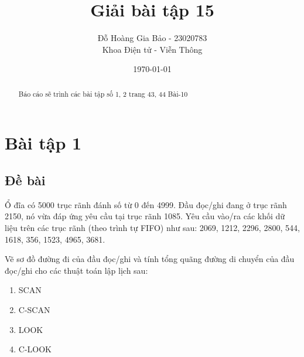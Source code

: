 \documentclass[12pt, letterpaper]{article}
\title{Giải bài tập 15}
\author{Đỗ Hoàng Gia Bảo - 23020783 \\ \small Khoa Điện tử - Viễn Thông}
\date{\today}
\begin{document}
\maketitle

\begin{abstract}
\begin{center}
    Báo cáo sẽ trình các bài tập số 1, 2 trang 43, 44  Bài-10
\end{center}
\end{abstract}
\newpage
\tableofcontents

\newpage
{}
\setcounter{page}{3} %

\section{Bài tập 1}
\subsection{Đề bài}
Ổ đĩa có 5000 trục rãnh đánh số từ 0 đến 4999. Đầu đọc/ghi 
đang ở trục rãnh 2150, nó vừa đáp ứng yêu cầu tại
trục rãnh 1085. Yêu cầu vào/ra các khối dữ liệu trên các
trục rãnh (theo trình tự FIFO) như sau: 2069, 1212,
2296, 2800, 544, 1618, 356, 1523, 4965, 3681.

Vẽ sơ đồ đường đi của đầu đọc/ghi và tính tổng quãng
đường di chuyển của đầu đọc/ghi cho các thuật toán lập
lịch sau:
\begin{enumerate}[label=\alph*.]
    \item SCAN
    \item C-SCAN
    \item LOOK
    \item C-LOOK
\end{enumerate}
\end{document}
